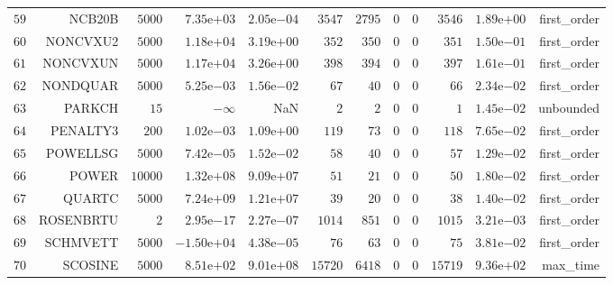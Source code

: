 \begin{longtable}{rrrrrrrrrrrr}
  \(    59\) & NCB20B & \(  5000\) & \( 7.35\)e\(+03\) & \( 2.05\)e\(-04\) & \(  3547\) & \(  2795\) & \(     0\) & \(     0\) & \(  3546\) & \( 1.89\)e\(+00\) & first\_order \\
  \(    60\) & NONCVXU2 & \(  5000\) & \( 1.18\)e\(+04\) & \( 3.19\)e\(+00\) & \(   352\) & \(   350\) & \(     0\) & \(     0\) & \(   351\) & \( 1.50\)e\(-01\) & first\_order \\
  \(    61\) & NONCVXUN & \(  5000\) & \( 1.17\)e\(+04\) & \( 3.26\)e\(+00\) & \(   398\) & \(   394\) & \(     0\) & \(     0\) & \(   397\) & \( 1.61\)e\(-01\) & first\_order \\
  \(    62\) & NONDQUAR & \(  5000\) & \( 5.25\)e\(-03\) & \( 1.56\)e\(-02\) & \(    67\) & \(    40\) & \(     0\) & \(     0\) & \(    66\) & \( 2.34\)e\(-02\) & first\_order \\
  \(    63\) & PARKCH & \(    15\) & \(-\infty\) &       NaN & \(     2\) & \(     2\) & \(     0\) & \(     0\) & \(     1\) & \( 1.45\)e\(-02\) & unbounded \\
  \(    64\) & PENALTY3 & \(   200\) & \( 1.02\)e\(-03\) & \( 1.09\)e\(+00\) & \(   119\) & \(    73\) & \(     0\) & \(     0\) & \(   118\) & \( 7.65\)e\(-02\) & first\_order \\
  \(    65\) & POWELLSG & \(  5000\) & \( 7.42\)e\(-05\) & \( 1.52\)e\(-02\) & \(    58\) & \(    40\) & \(     0\) & \(     0\) & \(    57\) & \( 1.29\)e\(-02\) & first\_order \\
  \(    66\) & POWER & \( 10000\) & \( 1.32\)e\(+08\) & \( 9.09\)e\(+07\) & \(    51\) & \(    21\) & \(     0\) & \(     0\) & \(    50\) & \( 1.80\)e\(-02\) & first\_order \\
  \(    67\) & QUARTC & \(  5000\) & \( 7.24\)e\(+09\) & \( 1.21\)e\(+07\) & \(    39\) & \(    20\) & \(     0\) & \(     0\) & \(    38\) & \( 1.40\)e\(-02\) & first\_order \\
  \(    68\) & ROSENBRTU & \(     2\) & \( 2.95\)e\(-17\) & \( 2.27\)e\(-07\) & \(  1014\) & \(   851\) & \(     0\) & \(     0\) & \(  1015\) & \( 3.21\)e\(-03\) & first\_order \\
  \(    69\) & SCHMVETT & \(  5000\) & \(-1.50\)e\(+04\) & \( 4.38\)e\(-05\) & \(    76\) & \(    63\) & \(     0\) & \(     0\) & \(    75\) & \( 3.81\)e\(-02\) & first\_order \\
  \(    70\) & SCOSINE & \(  5000\) & \( 8.51\)e\(+02\) & \( 9.01\)e\(+08\) & \( 15720\) & \(  6418\) & \(     0\) & \(     0\) & \( 15719\) & \( 9.36\)e\(+02\) & max\_time \\

\end{longtable}
